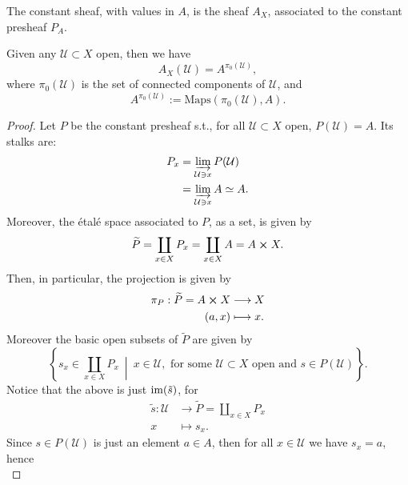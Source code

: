 \documentclass[../Main]{subfiles}
\begin{document}
\begin{defn}
	The constant sheaf, with values in $A$, is the sheaf $A_X$,
	associated to the constant presheaf $P_A$.
\end{defn}
\begin{rem}[]
	Given any $\mathcal{U} \subset X$ open, then we have
	\begin{equation}
		A_X(\mathcal{U}) = A^{\pi_0(\mathcal{U})}
	,\end{equation} 
	where $\pi_0(\mathcal{U})$ is the set of connected components of $\mathcal{U}$,
	and
	\begin{equation}
		A^{\pi_0(\mathcal{U})} :=
		\mathrm{Maps} \left( \pi_0(\mathcal{U}), A \right)
	.\end{equation} 
\end{rem}
\begin{proof}
	Let $P$ be the constant presheaf s.t., for all $\mathcal{U}\subset X$ open,
	$P(\mathcal{U}) = A$.
	Its stalks are:
	\begin{align}
		P_x &=
		\varinjlim_{\mathcal{U} \ni x} P(\mathcal{U}) \\
		    &= \varinjlim_{\mathcal{U} \ni x} A \simeq A
	.\end{align} 
	Moreover, the étalé space associated to $P$, as a set, is given by
	\begin{equation}
	\widetilde{P} = \coprod_{x \in X} P_x =
	\coprod_{x \in X} A = A \cross X
	.\end{equation} 
	Then, in particular, the projection is given by
	\begin{align}
		\pi_P: \widetilde{P} = A \cross X &\longrightarrow X \\
		\left(a, x\right) &\longmapsto x \nonumber
	.\end{align} 
	Moreover the basic open subsets of $\widetilde{P}$ are given by
	\begin{equation}
	\left\{ s_x \in \coprod_{x \in X} P_x \ \middle|\ 
	x \in \mathcal{U}, \text{ for some } \mathcal{U} \subset X \text{ open and }
s \in P(\mathcal{U}) \right\}
	.\end{equation} 
	Notice that the above is just $\operatorname{im}(\tilde{s})$, for
	\begin{align}
		\tilde{s}: \mathcal{U} &\longrightarrow \widetilde{P} = \coprod_{x \in X}P_x \\
		x &\longmapsto s_x \nonumber
	.\end{align} 
	Since $s \in P(\mathcal{U})$ is just an element $a \in A$, then 
	for all $x \in \mathcal{U}$ we have $s_x = a$, hence
	\begin{equation}

\end{equation}
\end{proof}
\end{document}
